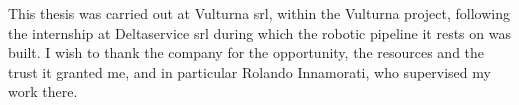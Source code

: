 
\begin{acknowledgments}

This thesis was carried out at Vulturna srl, within the Vulturna project,
following the internship at Deltaservice srl during which the robotic pipeline
it rests on was built. I wish to thank the company for the opportunity,
the resources and the trust it granted me, and in particular Rolando Innamorati,
who supervised my work there.

\end{acknowledgments}
